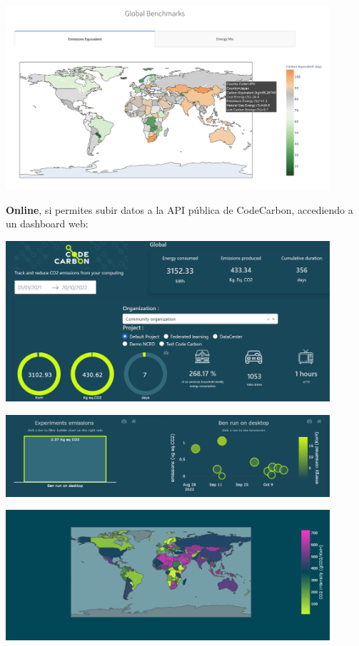 \documentclass[12pt,a4paper]{report}
\begin{document}
\begin{center}
  \includegraphics[width=0.9\textwidth]{imagenes/CC_2.png}
\end{center}

\textbf{Online}, si permites subir datos a la API pública de CodeCarbon, accediendo a un dashboard web:

\begin{center}
  \includegraphics[width=0.9\textwidth]{imagenes/CC_3.png}
\end{center}

\begin{center}
  \includegraphics[width=0.9\textwidth]{imagenes/CC_4.png}
\end{center}

\begin{center}
  \includegraphics[width=0.9\textwidth]{imagenes/CC_5.png}
\end{center}
\end{document}
